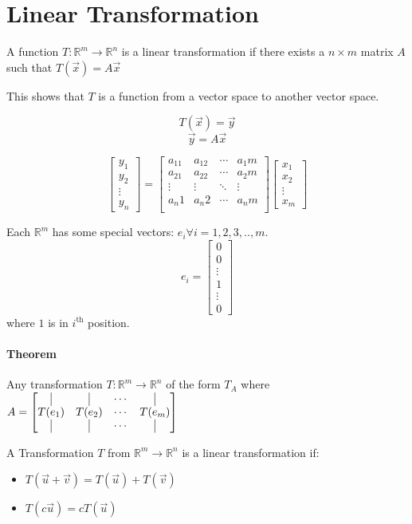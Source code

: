 \documentclass{article}
\begin{document}
\section{Linear Transformation}
A function $T: \mathbb{R}^m \rightarrow \mathbb{R}^n$ is a linear transformation if there exists a $n\times m $ matrix $A$ such that $T(\vec{x}) = A\vec{x}$

This shows that $T$ is a function from a vector space to another vector space.

\[ T(\vec{x}) = \vec{y} \]
\[ \vec{y} = A\vec{x} \]

\[ \begin{bmatrix}
    y_1 \\
    y_2 \\
    \vdots \\
    y_n
\end{bmatrix} = \begin{bmatrix}
    a_11 & a_12 & \cdots & a_1m \\
    a_21 & a_22 & \cdots & a_2m \\
    \vdots & \vdots & \ddots & \vdots \\
    a_n1 & a_n2 & \cdots & a_nm \\
\end{bmatrix} \begin{bmatrix}
    x_1 \\
    x_2 \\
    \vdots \\
    x_m
\end{bmatrix} \]

Each $\mathbb{R}^m$ has some special vectors: \( e_i \forall i = 1,2,3,..,m \).\\
\[ e_i = \begin{bmatrix}
    0 \\
    0 \\
    \vdots \\
    1 \\ 
    \vdots \\
    0
\end{bmatrix} \]
where $1$ is in $i^{\text{th}}$ position.

\paragraph{Theorem} Any transformation $T: \mathbb{R}^m \rightarrow \mathbb{R}^n$ of the form $T_A$ where $A = \begin{bmatrix}
    \vline & \vline & \cdots & \vline \\
    T(e_1) & T(e_2) & \cdots & T(e_m) \\
    \vline & \vline & \cdots & \vline \\
\end{bmatrix}$

A Transformation $T$ from $\mathbb{R}^m \rightarrow \mathbb{R}^n$ is a linear transformation if:
\begin{itemize}
    \item $T(\vec{u} + \vec{v}) = T(\vec{u}) + T(\vec{v})$
    \item $T(c\vec{u}) = cT(\vec{u})$
\end{itemize}
\end{document}
